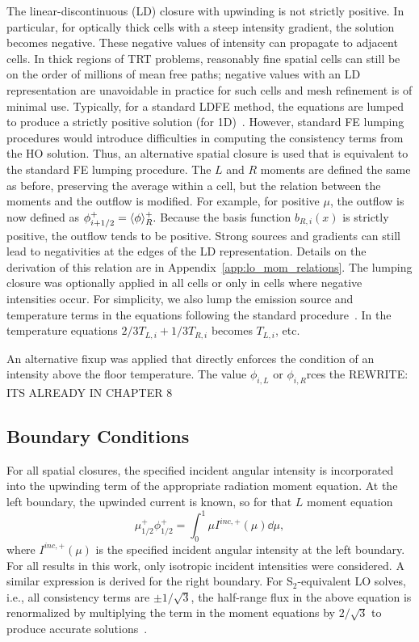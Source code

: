 The linear-discontinuous (LD) closure with upwinding is not strictly positive.  In particular, for
optically thick cells with a steep intensity gradient, the solution becomes negative.
These negative values of intensity can propagate to adjacent cells. In thick regions of
TRT problems, reasonably fine spatial cells can still be on the order of millions of mean
free paths; negative values with an LD representation are unavoidable in practice for
such cells and mesh refinement is of minimal use.  Typically, for a standard LDFE method,
the equations are lumped to produce a strictly positive solution (for 1D)~\cite{morel_ldtrt}. However, standard FE lumping
procedures would introduce difficulties in computing the consistency terms from the
HO solution.  Thus, an alternative spatial closure is used that is equivalent to the
standard FE lumping procedure.  The $L$ and $R$ moments are defined the same as before,
preserving the average within a cell, but the relation between the moments and
the outflow is modified.   For example, for positive $\mu$,
the outflow is now defined as $\phi^+_{i+1/2} = \langle \phi \rangle_R^+.$      Because the basis function $b_{R,i}(x)$ is strictly
positive, the outflow tends to be positive. Strong sources and gradients can still lead to
negativities at the edges of the LD representation.  Details on the
derivation of this relation are in Appendix~\ref{app:lo_mom_relations}. 
The lumping closure was optionally applied in all cells or only in cells where negative
 intensities occur.  
For simplicity,
we also lump the emission source and temperature terms in the equations following the
standard procedure~\cite{morel_ldtrt}.  In the temperature equations $2/3
T_{L,i} + 1/3 T_{R,i}$ becomes $T_{L,i}$, etc.  

An alternative fixup was applied that directly enforces the condition of an intensity
above the floor temperature.  The value $\phi_{i,L}$ or $\phi_{i,R}$rces the 
REWRITE: ITS ALREADY IN CHAPTER 8

\subsection{Boundary Conditions}

For all spatial closures, the specified incident angular intensity is
incorporated into the upwinding term of the appropriate radiation moment equation.   At the left
boundary, the upwinded current is known, so for that $L$ moment equation
\begin{equation}
    \mu_{1/2}^+ \phi_{1/2}^+ = \int_{0}^1 \mu I^{inc,+}(\mu) \dd \mu,
\end{equation}
where $I^{inc,+}(\mu)$ is the specified incident angular intensity at the left boundary.  For all
results in this work, only isotropic incident intensities were considered.
A similar expression is derived for the right boundary.
  For S$_2$-equivalent LO solves, i.e., all consistency
terms are $\pm 1/\sqrt{3}$, the half-range flux in the above equation is renormalized by
multiplying the term in the moment equations by $2/\sqrt{3}$ to produce accurate solutions~\cite{morel_notes}.     


